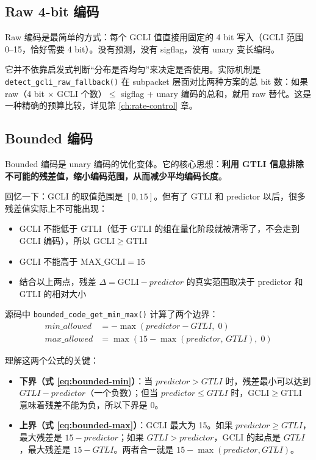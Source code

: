 \subsection{Raw 4-bit 编码}

Raw 编码是最简单的方式：每个 GCLI 值直接用固定的 4 bit 写入（GCLI 范围 0--15，恰好需要 4 bit）。没有预测，没有 sigflag，没有 unary 变长编码。

它并不依靠启发式判断``分布是否均匀''来决定是否使用。实际机制是 \texttt{detect\_gcli\_raw\_fallback()} 在 subpacket 层面对比两种方案的总 bit 数：如果 raw（4 bit $\times$ GCLI 个数）$\leq$ sigflag + unary 编码的总和，就用 raw 替代。这是一种精确的预算比较，详见第 \ref{ch:rate-control} 章。

\subsection{Bounded 编码}

Bounded 编码是 unary 编码的优化变体。它的核心思想：\textbf{利用 GTLI 信息排除不可能的残差值，缩小编码范围，从而减少平均编码长度}。

回忆一下：GCLI 的取值范围是 $[0, 15]$。但有了 GTLI 和 predictor 以后，很多残差值实际上不可能出现：
\begin{itemize}
  \item GCLI 不能低于 GTLI（低于 GTLI 的组在量化阶段就被清零了，不会走到 GCLI 编码），所以 $\mathrm{GCLI} \geq \mathrm{GTLI}$
  \item GCLI 不能高于 $\mathrm{MAX\_GCLI} = 15$
  \item 结合以上两点，残差 $\Delta = \mathrm{GCLI} - \mathit{predictor}$ 的真实范围取决于 predictor 和 GTLI 的相对大小
\end{itemize}

源码中 \texttt{bounded\_code\_get\_min\_max()} 计算了两个边界：
\begin{align}
\mathit{min\_allowed} &= -\max(\mathit{predictor} - \mathit{GTLI},\; 0) \label{eq:bounded-min}\\
\mathit{max\_allowed} &= \max(15 - \max(\mathit{predictor},\, \mathit{GTLI}),\; 0) \label{eq:bounded-max}
\end{align}

理解这两个公式的关键：
\begin{itemize}
  \item \textbf{下界（式 \ref{eq:bounded-min}）}：当 $\mathit{predictor} > \mathit{GTLI}$ 时，残差最小可以达到 $\mathit{GTLI} - \mathit{predictor}$（一个负数）；但当 $\mathit{predictor} \leq \mathit{GTLI}$ 时，$\mathrm{GCLI} \geq \mathrm{GTLI}$ 意味着残差不能为负，所以下界是 0。
  \item \textbf{上界（式 \ref{eq:bounded-max}）}：$\mathrm{GCLI}$ 最大为 15。如果 $\mathit{predictor} \geq \mathit{GTLI}$，最大残差是 $15 - \mathit{predictor}$；如果 $\mathit{GTLI} > \mathit{predictor}$，$\mathrm{GCLI}$ 的起点是 $\mathit{GTLI}$，最大残差是 $15 - \mathit{GTLI}$。两者合一就是 $15 - \max(\mathit{predictor}, \mathit{GTLI})$。
\end{itemize}

